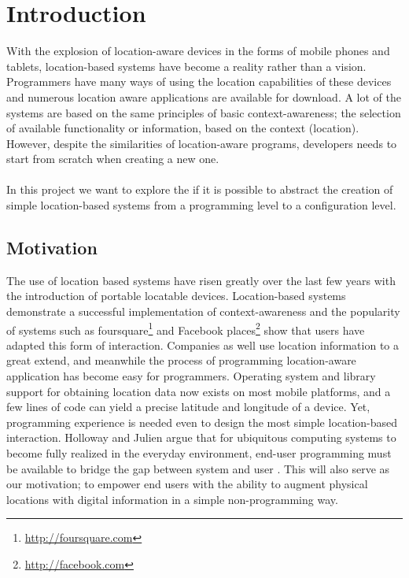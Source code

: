 
\section{Introduction}
\label{sec.introduction}
With the explosion of location-aware devices in the forms of mobile phones and tablets, location-based systems have become a reality rather than a vision. Programmers have many ways of using the location capabilities of these devices and numerous location aware applications are available for download. A lot of the systems are based on the same principles of basic context-awareness; the selection of available functionality or information, based on the context (location). However, despite the similarities of location-aware programs, developers needs to start from scratch when creating a new one. 
\\\\
In this project we want to explore the if it is possible to abstract the creation of simple location-based systems from a programming level to a configuration level.


\subsection{Motivation} %
\label{sub:context_and_motivation}
The use of location based systems have risen greatly over the last few years with the introduction of portable locatable devices. Location-based systems demonstrate a successful implementation of context-awareness and the popularity of systems such as foursquare\footnote{\url{http://foursquare.com}} and Facebook places\footnote{\url{http://facebook.com}} show that users have adapted this form of interaction. Companies as well use location information to a great extend, and meanwhile the process of programming location-aware application has become easy for programmers. Operating system and library support for obtaining location data now exists on most mobile platforms, and a few lines of code can yield a precise latitude and longitude of a device. Yet, programming experience is needed even to design the most simple location-based interaction. Holloway and Julien argue that for ubiquitous computing systems to become fully realized in the everyday environment, end-user programming must be available to bridge the gap between system and user \cite{Holloway:2010:CEP:1882362.1882398}. This will also serve as our motivation; to empower end users with the ability to augment physical locations with digital information in a simple non-programming way.

